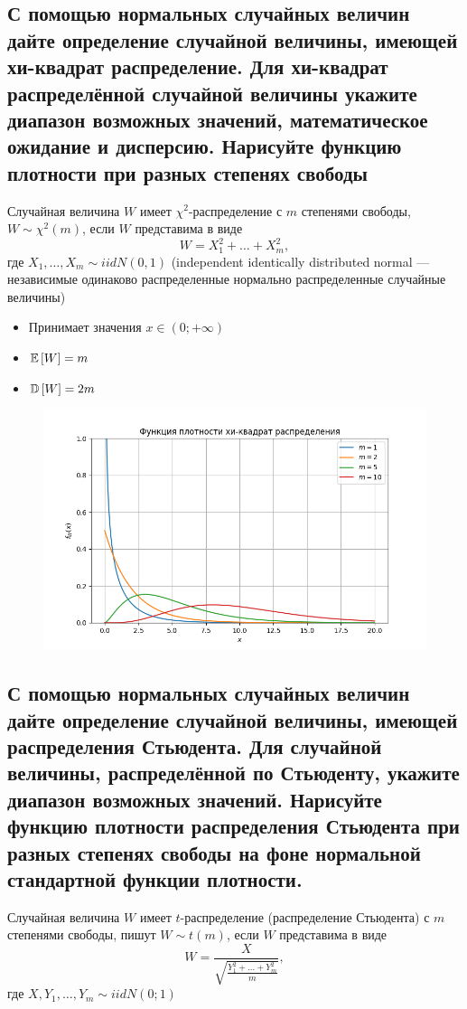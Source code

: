 \documentclass{article}
\begin{document}
\newpage
\subsection{С помощью нормальных случайных величин дайте определение случайной величины, имеющей хи-квадрат распределение. Для хи-квадрат распределённой случайной величины укажите диапазон возможных значений, математическое ожидание и дисперсию. Нарисуйте функцию плотности при разных степенях свободы}
 Случайная величина $W$ имеет $\chi^2$-распределение с $m$ степенями свободы, $W\sim\chi^2(m)$, если $W$ представима в виде
\begin{equation*}
    W=X_1^2+\ldots+X_m^2,
\end{equation*}
где $X_1,\ldots,X_m\sim iidN(0,1)$ (independent identically distributed normal — независимые одинаково распределенные нормально распределенные случайные величины)
\begin{itemize}
    \item Принимает значения $x\in(0;+\infty)$
    \item $\mathbb{E}\left[W\right]=m$
    \item $\mathbb{D}\left[W\right]=2m$
\end{itemize}
\begin{figure}[h]
    \centering
    \includegraphics[width=0.8\linewidth]{chi.png}
\end{figure}

\newpage
\subsection{С помощью нормальных случайных величин дайте определение случайной величины, имеющей распределения Стьюдента. Для случайной величины, распределённой по Стьюденту, укажите диапазон возможных значений. Нарисуйте функцию плотности распределения Стьюдента при разных степенях свободы на фоне нормальной стандартной функции плотности.}
 Случайная величина $W$ имеет $t$-распределение (распределение Стьюдента) с $m$ степенями свободы, пишут $W\sim t(m)$, если $W$ представима в виде
\begin{equation*}
    W=\frac{X}{\sqrt{\frac{Y_1^2+\ldots+Y_m^2}{m}}},
\end{equation*}
где $X,Y_1,\ldots,Y_m\sim iidN(0;1)$
\end{document}
